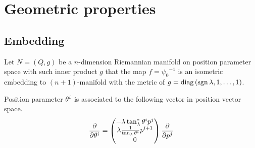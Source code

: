 \documentclass[../main.tex]{subfiles}
\begin{document}
\section{Geometric properties}
\subsection{Embedding}
\begin{definition}\label{M:Embedding}
Let $N=\left(Q,g\right)$ be a $n$-dimension Riemannian manifold
on position parameter space with such inner product $g$ that
the map $f={\psi_0}^{-1}$
is an isometric embedding to $\left(n+1\right)$-manifold
with the metric of $g=\operatorname{diag}{\left(\operatorname{sgn}{\lambda},1,\dots,1\right)}$.
\end{definition}
\begin{lemma}\label{M:Tangent:Basis}
Position parameter $\tensor{\theta}{^i}$ is associated to the following vector in position vector space.
\begin{equation*}
\frac{\partial}{\partial\tensor{\theta}{^i}}=
\begin{pmatrix}
-\lambda\tan_\lambda^\ast\tensor{\theta}{^i}\tensor{p}{^j}\\
\lambda\frac{1}{\tan_\lambda\tensor{\theta}{^i}}\tensor{p}{^{i+1}}\\
0
\end{pmatrix}\frac{\partial}{\partial\tensor{p}{^j}}
\end{equation*}
\end{lemma}
\end{document}
